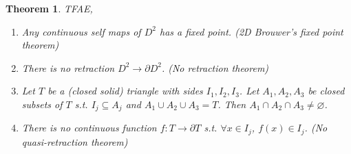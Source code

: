 \documentclass{article}
\theoremstyle{definition}
\theoremstyle{remark}
\theoremstyle{plain}
\newtheorem{thm}[defn]{Theorem}
\begin{document}
\begin{thm}
    TFAE,
    \begin{enumerate}
        \item[(a)] Any continuous self maps of $D^2$ has a fixed point. (2D Brouwer's fixed point theorem)
        \item[(b)] There is no retraction $D^2\to \partial D^2$. (No retraction theorem)
        \item[(c)] Let $T$ be a (closed solid) triangle with sides $I_1,I_2,I_3$. Let $A_1,A_2,A_3$ be closed subsets of $T$ s.t. $I_j\subseteq A_j$ and $A_1\cup A_2\cup A_3=T$. Then $A_1\cap A_2\cap A_3\neq\varnothing$.
        \item[(d)] There is no continuous function $f:T\to\partial T$ s.t. $\forall x\in I_j$, $f(x)\in I_j$. (No quasi-retraction theorem)
    \end{enumerate}
\end{thm}
\end{document}
